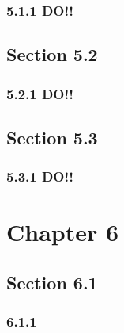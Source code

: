 \documentclass[12pt]{article}
\begin{document}
\subsubsection{5.1.1 DO!!}

\subsection{Section 5.2}

\subsubsection{5.2.1 DO!!}

\subsection{Section 5.3}

\subsubsection{5.3.1 DO!!}

\section{Chapter 6}

\subsection{Section 6.1}

\subsubsection{6.1.1}
\end{document}
